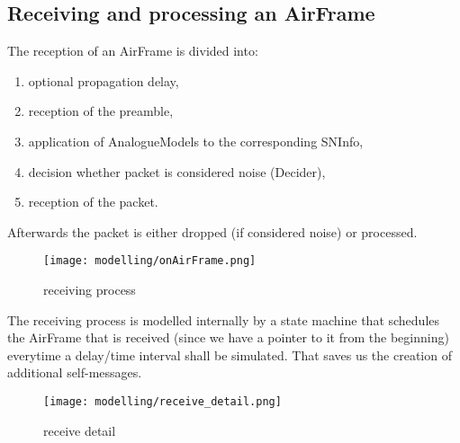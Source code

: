\subsection{Receiving and processing an AirFrame}

The reception of an AirFrame is divided into:
\begin{enumerate}
	
	\item optional propagation delay,
	\item reception of the preamble,
	\item application of AnalogueModels to the corresponding SNInfo,
	\item decision whether packet is considered noise (Decider),
	\item reception of the packet.
\end{enumerate}

Afterwards the packet is either dropped (if considered noise) or processed. 

\begin{figure}[H]
 \centering
 \texttt{[image: modelling/onAirFrame.png]}
 \caption{receiving process}
 \label{fig: receiving process}
\end{figure}

The receiving process is modelled internally by a state machine that schedules the AirFrame that is received (since we have a pointer to it from the beginning) everytime a delay/time interval shall be simulated. That saves us the creation of additional self-messages.


\begin{figure}[H]
 \centering
 \texttt{[image: modelling/receive\_detail.png]}
 \caption{receive detail}
 \label{fig: receive detail}
\end{figure}





